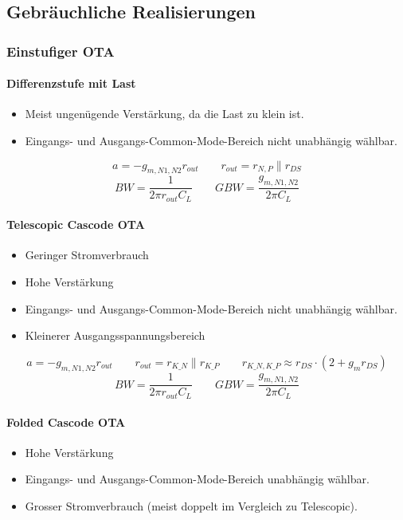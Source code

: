 \subsection{Gebräuchliche Realisierungen}

\subsubsection{Einstufiger OTA}
\paragraph{Differenzstufe mit Last}
\begin{itemize}
    \item Meist ungenügende Verstärkung, da die Last zu klein ist.
    \item Eingangs- und Ausgangs-Common-Mode-Bereich nicht unabhängig wählbar.
\end{itemize}
\[
    a = - g_{m, N1, N2} r_{out} \qquad r_{out} = r_{N,P} \parallel r_{DS}
\]
\[
    BW = \frac{1}{2\pi r_{out} C_{L}} \qquad GBW = \frac{g_{m, N1, N2}}{2\pi C_{L}}
\]

\paragraph{Telescopic Cascode OTA}
\begin{itemize}
    \item Geringer Stromverbrauch
    \item Hohe Verstärkung
    \item Eingangs- und Ausgangs-Common-Mode-Bereich nicht unabhängig wählbar.
    \item Kleinerer Ausgangsspannungsbereich
\end{itemize}
\[
    a = - g_{m, N1, N2} r_{out} \qquad r_{out} = r_{K\_N} \parallel r_{K\_P} \qquad r_{K\_N, K\_P} \approx r_{DS} \cdot (2+g_m r_{DS})
\]
\[
    BW = \frac{1}{2\pi r_{out} C_{L}} \qquad GBW = \frac{g_{m, N1, N2}}{2\pi C_{L}}
\]

\paragraph{Folded Cascode OTA}
\begin{itemize}
    \item Hohe Verstärkung
    \item Eingangs- und Ausgangs-Common-Mode-Bereich unabhängig wählbar.
    \item Grosser Stromverbrauch (meist doppelt im Vergleich zu Telescopic).
\end{itemize}


